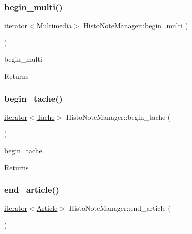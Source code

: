 \subsubsection{\texorpdfstring{begin\+\_\+multi()}{begin\_multi()}}
{\footnotesize\ttfamily \hyperlink{class_histo_note_manager_1_1iterator}{iterator}$<$\hyperlink{class_multimedia}{Multimedia}$>$ Histo\+Note\+Manager\+::begin\+\_\+multi (\begin{DoxyParamCaption}{ }\end{DoxyParamCaption})\hspace{0.3cm}{\ttfamily [inline]}}



begin\+\_\+multi 

\begin{DoxyReturn}{Returns}

\end{DoxyReturn}
\mbox{\label{class_histo_note_manager_a55b63250519f28014747eab460fc6e6c}} 
\subsubsection{\texorpdfstring{begin\+\_\+tache()}{begin\_tache()}}
{\footnotesize\ttfamily \hyperlink{class_histo_note_manager_1_1iterator}{iterator}$<$\hyperlink{class_tache}{Tache}$>$ Histo\+Note\+Manager\+::begin\+\_\+tache (\begin{DoxyParamCaption}{ }\end{DoxyParamCaption})\hspace{0.3cm}{\ttfamily [inline]}}



begin\+\_\+tache 

\begin{DoxyReturn}{Returns}

\end{DoxyReturn}
\mbox{\label{class_histo_note_manager_a6b3bf215eb0e27eaa7affa9824dd5785}} 
\subsubsection{\texorpdfstring{end\+\_\+article()}{end\_article()}}
{\footnotesize\ttfamily \hyperlink{class_histo_note_manager_1_1iterator}{iterator}$<$\hyperlink{class_article}{Article}$>$ Histo\+Note\+Manager\+::end\+\_\+article (\begin{DoxyParamCaption}{ }\end{DoxyParamCaption})\hspace{0.3cm}{\ttfamily [inline]}}



